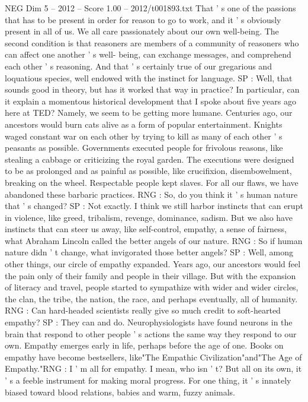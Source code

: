 \begin{textsample}{NEG Dim 5 – 2012 – Score 1.00 – 2012/t001893.txt}
That ' s one of the passions that has to be present in order for reason to go to work, and it ' s obviously present in all of us.
We all care passionately about our own well-being.
The second condition is that reasoners are members of a community of reasoners who can affect one another ' s well- being, can exchange messages, and comprehend each other ' s reasoning.
And that ' s certainly true of our gregarious and loquatious species, well endowed with the instinct for language.
SP : Well, that sounds good in theory, but has it worked that way in practice?
In particular, can it explain a momentous historical development that I spoke about five years ago here at TED?
Namely, we seem to be getting more humane.
Centuries ago, our ancestors would burn cats alive as a form of popular entertainment.
Knights waged constant war on each other by trying to kill as many of each other ' s peasants as possible.
Governments executed people for frivolous reasons, like stealing a cabbage or criticizing the royal garden.
The executions were designed to be as prolonged and as painful as possible, like crucifixion, disembowelment, breaking on the wheel.
Respectable people kept slaves.
For all our flaws, we have abandoned these barbaric practices.
RNG : So, do you think it ' s human nature that ' s changed?
SP : Not exactly.
I think we still harbor instincts that can erupt in violence, like greed, tribalism, revenge, dominance, sadism.
But we also have instincts that can steer us away, like self-control, empathy, a sense of fairness, what Abraham Lincoln called the better angels of our nature.
RNG : So if human nature didn ' t change, what invigorated those better angels?
SP : Well, among other things, our circle of empathy expanded.
Years ago, our ancestors would feel the pain only of their family and people in their village.
But with the expansion of literacy and travel, people started to sympathize with wider and wider circles, the clan, the tribe, the nation, the race, and perhaps eventually, all of humanity.
RNG : Can hard-headed scientists really give so much credit to soft-hearted empathy?
SP : They can and do.
Neurophysiologists have found neurons in the brain that respond to other people ' s actions the same way they respond to our own.
Empathy emerges early in life, perhaps before the age of one.
Books on empathy have become bestsellers, like"The Empathic Civilization"and"The Age of Empathy."RNG : I ' m all for empathy.
I mean, who isn ' t?
But all on its own, it ' s a feeble instrument for making moral progress.
For one thing, it ' s innately biased toward blood relations, babies and warm, fuzzy animals.

\end{textsample}
